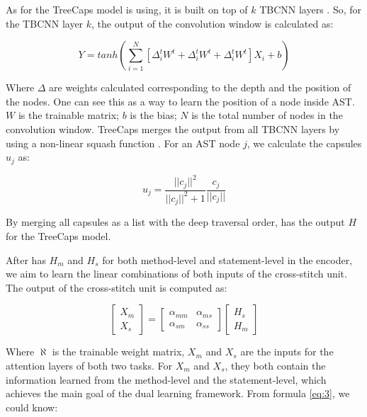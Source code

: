 As for the TreeCaps model \tool is using, it is built on top of $k$ TBCNN layers \cite{mou2014tbcnn}. So, for the TBCNN layer $k$, the output of the convolution window is calculated as:

\begin{equation}\label{eq:1}
	Y = tanh(\sum_{i=1}^{N}[\Delta^t_iW^t + \Delta^t_iW^t + \Delta^t_iW^t]X_i + b)
\end{equation}

Where $\Delta$ are weights calculated corresponding to the depth and the position of the nodes. One can see this as a
way to learn the position of a node inside AST. $W$ is the trainable matrix; $b$ is the bias; $N$ is the total number of nodes in the convolution window. TreeCaps merges the output from all TBCNN layers by using a non-linear squash
function \cite{sabour2017dynamic}. For an AST node $j$, we calculate the capsules $u_j$ as:

\begin{equation}\label{eq:2}
	u_j = \frac{||c_j||^2}{||c_j||^2+1}\frac{c_j}{||c_j||}
\end{equation}

By merging all capsules as a list with the deep traversal order, \tool has the output $H$ for the TreeCaps model.

After \tool has $H_m$ and $H_s$ for both method-level and statement-level in the encoder, we aim to learn the linear combinations of both inputs of the cross-stitch unit. The output of the cross-stitch unit is computed as:

\begin{equation}\label{eq:3}
	\begin{bmatrix}
		X_m\\
		X_s
	\end{bmatrix}
	=
	\begin{bmatrix}
		\alpha_{mm} &  \alpha_{ms} \\
		\alpha_{sm} &  \alpha_{ss}
	\end{bmatrix}
	\begin{bmatrix}
		H_s\\
		H_m
	\end{bmatrix}
\end{equation}

Where $\aleph$ is the trainable weight matrix, $X_m$ and $X_s$ are the inputs for the attention layers of both two tasks. For $X_m$ and $X_s$, they both contain the information learned from the method-level and the statement-level, which achieves the main goal of the dual learning framework. From formula \ref{eq:3}, we could know:

